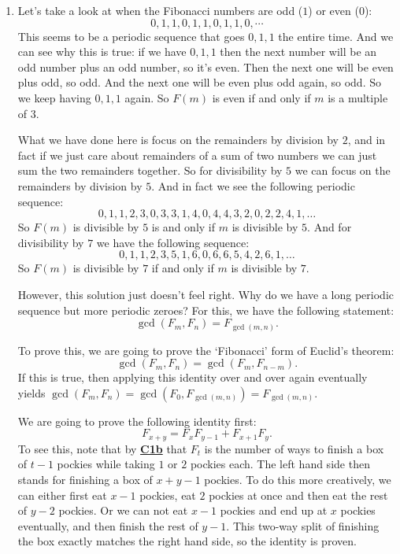 \documentclass[11pt]{scrartcl}
\begin{document}
\begin{enumerate}[label=\textbf{N\arabic*}.]
\begin{enumerate}
       \item Let's take a look at when the Fibonacci numbers are odd ($1$) or even ($0$): \[ 0, 1, 1, 0, 1, 1, 0, 1, 1, 0, \cdots \] This seems to be a periodic sequence that goes $0,1,1$ the entire time. And we can see why this is true: if we have $0,1,1$ then the next number will be an odd number plus an odd number, so it's even. Then the next one will be even plus odd, so odd. And the next one will be even plus odd again, so odd. So we keep having $0, 1, 1$ again. So $F(m)$ is even if and only if $m$ is a multiple of $3$.
       
       What we have done here is focus on the remainders by division by $2$, and in fact if we just care about remainders of a sum of two numbers we can just sum the two remainders together. So for divisibility by $5$ we can focus on the remainders by division by $5$. And in fact we see the following periodic sequence: \[ 0,1,1,2,3,0,3,3,1,4,0,4,4,3,2,0,2,2,4,1, \ldots \] So $F(m)$ is divisible by $5$ is and only if $m$ is divisible by $5$. And for divisibility by $7$ we have the following sequence: \[ 0,1,1,2,3,5,1,6,0,6,6,5,4,2,6,1, \ldots \] So $F(m)$ is divisible by $7$ if and only if $m$ is divisible by $7$.
       
       However, this solution just doesn't feel right. Why do we have a long periodic sequence but more periodic zeroes? For this, we have the following statement: \[ \gcd(F_m, F_n) = F_{\gcd(m,n)}. \]
       
       To prove this, we are going to prove the `Fibonacci' form of Euclid's theorem:
       \[
         \gcd(F_m, F_n) = \gcd(F_m, F_{n-m}).
       \] 
       If this is true, then applying this identity over and over again eventually yields $\gcd(F_m, F_n) = \gcd(F_0, F_{\gcd(m,n)}) = F_{\gcd(m,n)}.$
       
       We are going to prove the following identity first:
       \[
         F_{x+y} = F_{x} F_{y-1} + F_{x+1} F_y.
       \]
       To see this, note that by \textbf{\hyperref[C1b]{C1b}} that $F_t$ is the number of ways to finish a box of $t-1$ pockies while taking $1$ or $2$ pockies each. The left hand side then stands for finishing a box of $x+y-1$ pockies. To do this more creatively, we can either first eat $x-1$ pockies, eat $2$ pockies at once and then eat the rest of $y-2$ pockies. Or we can not eat $x-1$ pockies and end up at $x$ pockies eventually, and then finish the rest of $y-1$. This two-way split of finishing the box exactly matches the right hand side, so the identity is proven.
       

\end{enumerate}
\end{enumerate}
\end{document}
